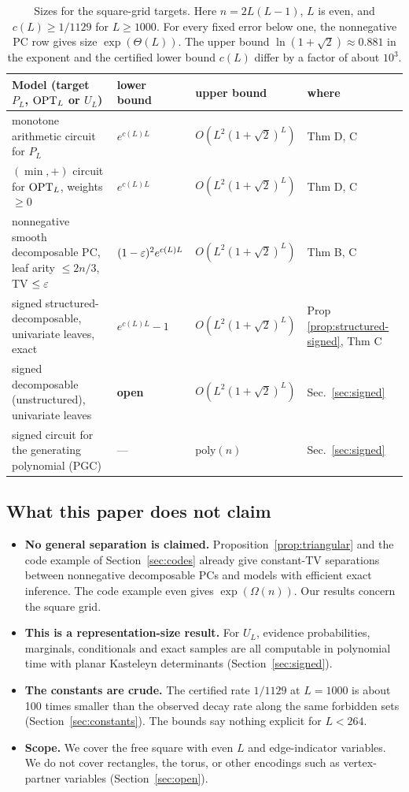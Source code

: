 \begin{table}[t]
\centering
\small
\begin{tabular}{@{}p{5.6cm}p{2.7cm}p{2.9cm}p{2.4cm}@{}}
\toprule
Model (target $P_L$, $\mathrm{OPT}_L$ or $U_L$) & lower bound & upper bound & where\\
\midrule
monotone arithmetic circuit for $P_L$ & $e^{c(L)L}$ & $O(L^2(1+\sqrt2)^L)$ & Thm D, C\\
$(\min,+)$ circuit for $\mathrm{OPT}_L$, weights $\ge0$ & $e^{c(L)L}$ & $O(L^2(1+\sqrt2)^L)$ & Thm D, C\\
nonnegative smooth decomposable PC, leaf arity $\le2n/3$, TV $\le\varepsilon$ & $(1-\varepsilon)^2e^{c(L)L}$ & $O(L^2(1+\sqrt2)^L)$ & Thm B, C\\
signed structured-decomposable, univariate leaves, exact & $e^{c(L)L}-1$ & $O(L^2(1+\sqrt2)^L)$ & Prop \ref{prop:structured-signed}, Thm C\\
signed decomposable (unstructured), univariate leaves & \textbf{open} & $O(L^2(1+\sqrt2)^L)$ & Sec.~\ref{sec:signed}\\
signed circuit for the generating polynomial (PGC) & --- & $\mathrm{poly}(n)$ & Sec.~\ref{sec:signed}\\
\bottomrule
\end{tabular}
\caption{Sizes for the square-grid targets. Here $n=2L(L-1)$, $L$ is even, and $c(L)\ge1/1129$ for $L\ge1000$. For every fixed error below one, the nonnegative PC row gives size $\exp(\Theta(L))$. The upper bound $\ln(1+\sqrt2)\approx0.881$ in the exponent and the certified lower bound $c(L)$ differ by a factor of about $10^3$.}
\label{tab:summary}
\end{table}

\subsection{What this paper does not claim}\label{sec:intro-scope}

\begin{itemize}
\item \textbf{No general separation is claimed.} Proposition~\ref{prop:triangular} and the code example of Section~\ref{sec:codes} already give constant-TV separations between nonnegative decomposable PCs and models with efficient exact inference. The code example even gives $\exp(\Omega(n))$. Our results concern the square grid.
\item \textbf{This is a representation-size result.} For $U_L$, evidence probabilities, marginals, conditionals and exact samples are all computable in polynomial time with planar Kasteleyn determinants (Section~\ref{sec:signed}).
\item \textbf{The constants are crude.} The certified rate $1/1129$ at $L=1000$ is about 100 times smaller than the observed decay rate along the same forbidden sets (Section~\ref{sec:constants}). The bounds say nothing explicit for $L<264$.
\item \textbf{Scope.} We cover the free square with even $L$ and edge-indicator variables. We do not cover rectangles, the torus, or other encodings such as vertex-partner variables (Section~\ref{sec:open}).
\end{itemize}

